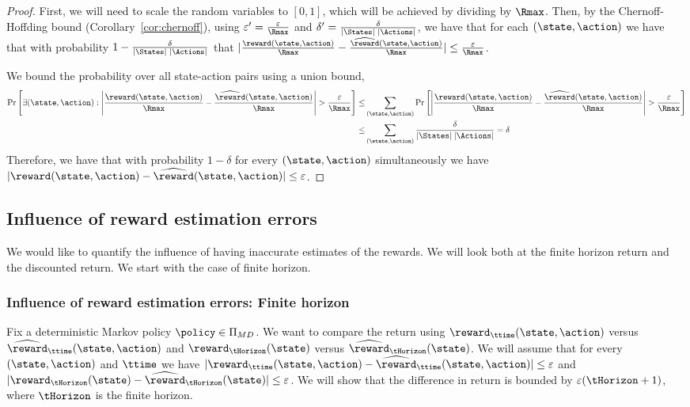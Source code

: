 \begin{proof}
First, we will need to scale the random variables to $[0,1]$, which
will be achieved by dividing by $\Rmax$. Then, by the
Chernoff-Hoffding bound (Corollary~\ref{cor:chernoff}), using
$\varepsilon'= \frac{\varepsilon}{\Rmax}$ and $\delta'=
\frac{\delta}{|\States|\;|\Actions|}$, we have that for each
$(\state,\action)$ we have that with probability
$1-\frac{\delta}{|\States|\;|\Actions|}$ that
$|\frac{\reward(\state,\action)}{\Rmax}-\frac{\widehat{\reward}(\state,\action)}{\Rmax}|\leq
\frac{\varepsilon}{\Rmax}$.

We bound the probability over all state-action pairs using a union
bound,
\begin{align*}
\Pr\left[\exists (\state,\action):
\left|\frac{\reward(\state,\action)}{\Rmax}-\frac{\widehat{\reward}(\state,\action)}{\Rmax}\right|
> \frac{\varepsilon}{\Rmax}\right] \leq &
\sum_{(\state,\action)} \Pr\left[
\left|\frac{\reward(\state,\action)}{\Rmax}-\frac{\widehat{\reward}(\state,\action)}{\Rmax}\right|
> \frac{\varepsilon}{\Rmax}\right] \\
\leq & \sum_{(\state,\action)}
\frac{\delta}{|\States|\;|\Actions|}=\delta
\end{align*}
 Therefore,
we have that with probability $1-\delta$ for every
$(\state,\action)$ simultaneously we have
$|\reward(\state,\action)-\widehat{\reward}(\state,\action)|\leq
\varepsilon$.
\end{proof}

\subsection{Influence of reward estimation errors}

We would like to quantify the influence of having inaccurate
estimates of the rewards. We will look both at the finite horizon
return and the discounted return. We start with the case of finite
horizon.

\subsubsection{Influence of reward estimation errors: Finite horizon}

Fix a deterministic Markov policy $\policy\in  {\Pi _{MD}}$. We want
to compare the return using $\reward_\ttime(\state,\action)$ versus
$\widehat{\reward}_\ttime(\state,\action)$ and $\reward_\tHorizon(\state)$
versus $\widehat{\reward}_\tHorizon(\state)$. We will assume that
for every $(\state,\action)$ and $\ttime$ we have
$|\reward_\ttime(\state,\action)-\widehat{\reward}_\ttime(\state,\action)|\leq
\varepsilon$ and
$|\reward_\tHorizon(\state)-\widehat{\reward}_\tHorizon(\state)|\leq
\varepsilon$. We will show that the difference in return is bounded
by $\varepsilon(\tHorizon+1)$, where $\tHorizon$ is the finite
horizon.


